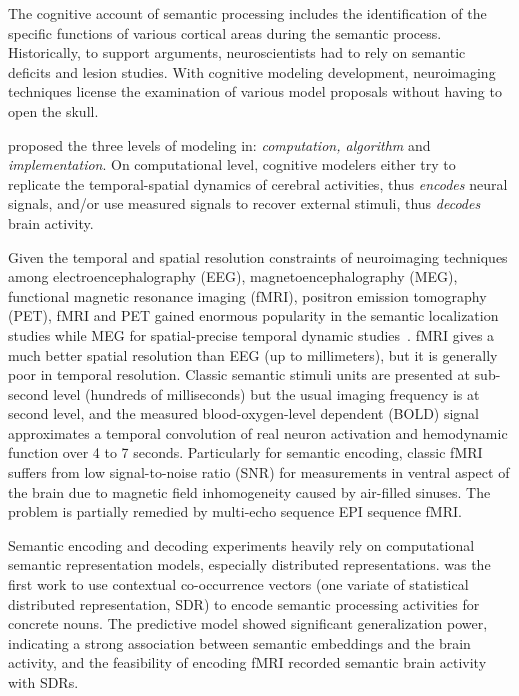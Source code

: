 The cognitive account of semantic processing includes the identification of the specific functions of various cortical areas during the semantic process. Historically, to support arguments, neuroscientists had to rely on semantic deficits and lesion studies. With cognitive modeling development, neuroimaging techniques license the examination of various model proposals without having to open the skull. 

\textcite{marrVisionComputationalInvestigation1982} proposed the three levels of modeling in: \emph{computation, algorithm} and \emph{implementation}. On computational level, cognitive modelers either try to replicate the temporal-spatial dynamics of cerebral activities, thus \emph{encodes} neural signals, and/or use measured signals to recover external stimuli, thus \emph{decodes} brain activity. 

Given the temporal and spatial resolution constraints of neuroimaging techniques among electroencephalography (EEG), magnetoencephalography (MEG), functional magnetic resonance imaging (fMRI), positron emission tomography (PET), fMRI and PET gained enormous popularity in the semantic localization studies while MEG for spatial-precise temporal dynamic studies~\parencite{molloOscillatoryDynamicsSupporting2017}. fMRI gives a much better spatial resolution than EEG (up to millimeters), but it is generally poor in temporal resolution. Classic semantic stimuli units are presented at sub-second level (hundreds of milliseconds) but the usual imaging frequency is at second level, and the measured blood-oxygen-level dependent (BOLD) signal approximates a temporal convolution of real neuron activation and hemodynamic function over 4 to 7 seconds. Particularly for semantic encoding, classic fMRI suffers from low signal-to-noise ratio (SNR) for measurements in ventral aspect of the brain due to magnetic field inhomogeneity caused by air-filled sinuses. The problem is partially remedied by multi-echo sequence EPI sequence fMRI.

Semantic encoding and decoding experiments heavily rely on computational semantic representation models, especially distributed representations. \textcite{mitchellPredictingHumanBrain2008} was the first work to use contextual co-occurrence vectors (one variate of statistical distributed representation, SDR) to encode semantic processing activities for concrete nouns. The predictive model showed significant generalization power, indicating a strong association between semantic embeddings and the brain activity, and the feasibility of encoding fMRI recorded semantic brain activity with SDRs.

